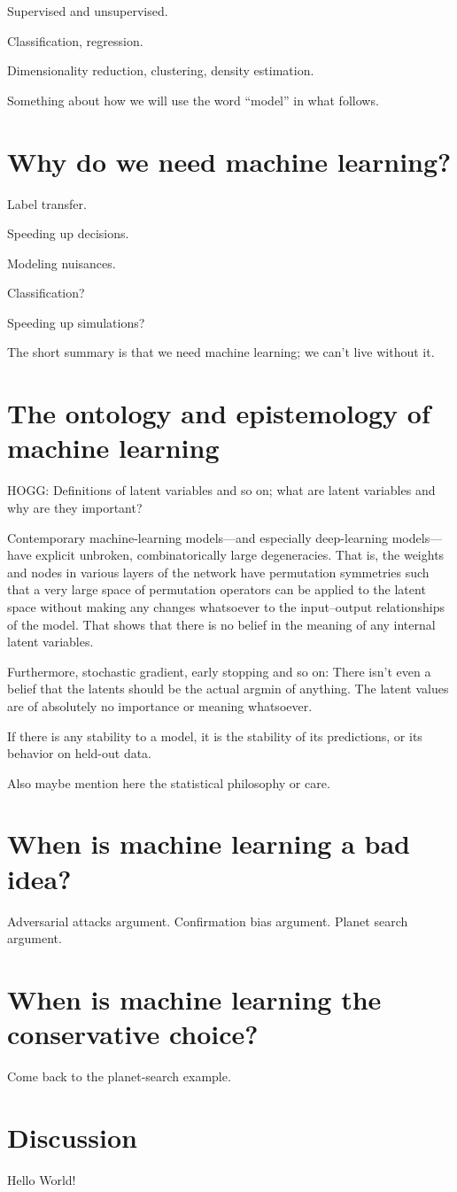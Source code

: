 \documentclass[11pt]{article}
\begin{document}
Supervised and unsupervised.

Classification, regression.

Dimensionality reduction, clustering, density estimation.

Something about how we will use the word ``model'' in what follows.

\section{Why do we need machine learning?}

Label transfer.

Speeding up decisions.

Modeling nuisances.

Classification?

Speeding up simulations?

The short summary is that we need machine learning; we can't live without it.

\section{The ontology and epistemology of machine learning}

HOGG: Definitions of latent variables and so on; what are latent variables and why are they important?

Contemporary machine-learning models---and especially deep-learning models---have explicit unbroken, combinatorically large degeneracies.
That is, the weights and nodes in various layers of the network have permutation symmetries such that a very large space of permutation operators can be applied to the latent space without making any changes whatsoever to the input--output relationships of the model.
That shows that there is no belief in the meaning of any internal latent variables.

Furthermore, stochastic gradient, early stopping and so on:
There isn't even a belief that the latents should be the actual argmin of anything.
The latent values are of absolutely no importance or meaning whatsoever.

If there is any stability to a model, it is the stability of its predictions, or its behavior on held-out data.

Also maybe mention here the statistical philosophy or care.

\section{When is machine learning a bad idea?}

Adversarial attacks argument. Confirmation bias argument. Planet search argument.

\section{When is machine learning the conservative choice?}

Come back to the planet-search example.

\section{Discussion}\label{sec:discussion}

Hello World!



\end{document}
